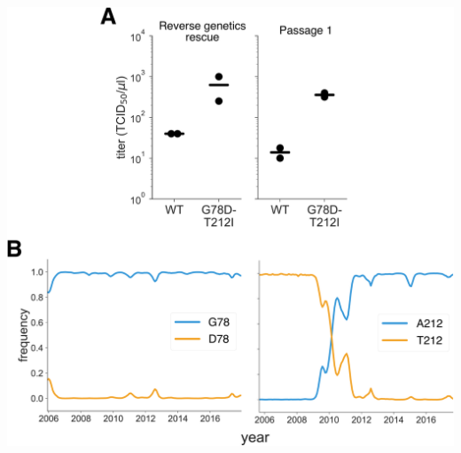 \documentclass[11pt]{article}
\begin{document}
\begin{suppfigure}
\centerline{\includegraphics[width=\textwidth]{figs/S01_G78D-T212I/G78D-T212I.pdf}}
\caption{\label{suppfig:Perth2009_mut}
{\bf Characterization of the G78D-T212I Perth/2009 HA variant.} 
(A) 
The G78D-T212I Perth/2009 HA variant grows to higher titers than do viruses carrying the wildtype Perth/2009 HA.
Each virus was generated in duplicate by reverse genetics and passaged once at MOI = 0.01 in MDCK-SIAT1-TMPRSS2 cells.
The rescue and passage viral supernatants were collected at 72 hours post-transfection and 44 hours post-infection, respectively, and titered in MDCK-SIAT1-TMPRSS2 cells. 
The points mark each duplicate and the bar marks the mean.
(B)
The D78 variant remained at a low frequency in natural human H3N2 sequences over the past $~\sim$10 years.
The A212 variant rose to fixation in $~\sim$2011, replacing the T212 variant.
}
\end{suppfigure}
\end{document}
